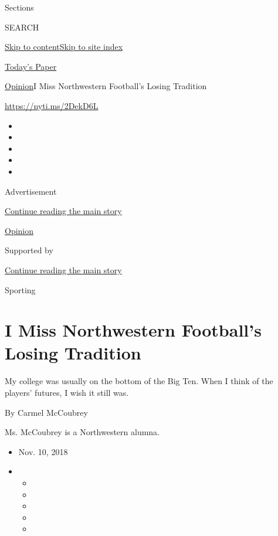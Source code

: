 Sections

SEARCH

\protect\hyperlink{site-content}{Skip to
content}\protect\hyperlink{site-index}{Skip to site index}

\href{https://myaccount.nytimes3xbfgragh.onion/auth/login?response_type=cookie\&client_id=vi}{}

\href{https://www.nytimes3xbfgragh.onion/section/todayspaper}{Today's
Paper}

\href{/section/opinion}{Opinion}\textbar{}I Miss Northwestern Football's
Losing Tradition

\url{https://nyti.ms/2DekD6L}

\begin{itemize}
\item
\item
\item
\item
\item
\end{itemize}

Advertisement

\protect\hyperlink{after-top}{Continue reading the main story}

\href{/section/opinion}{Opinion}

Supported by

\protect\hyperlink{after-sponsor}{Continue reading the main story}

Sporting

\hypertarget{i-miss-northwestern-footballs-losing-tradition}{%
\section{I Miss Northwestern Football's Losing
Tradition}\label{i-miss-northwestern-footballs-losing-tradition}}

My college was usually on the bottom of the Big Ten. When I think of the
players' futures, I wish it still was.

By Carmel McCoubrey

Ms. McCoubrey is a Northwestern alumna.

\begin{itemize}
\item
  Nov. 10, 2018
\item
  \begin{itemize}
  \item
  \item
  \item
  \item
  \item
  \end{itemize}
\end{itemize}


